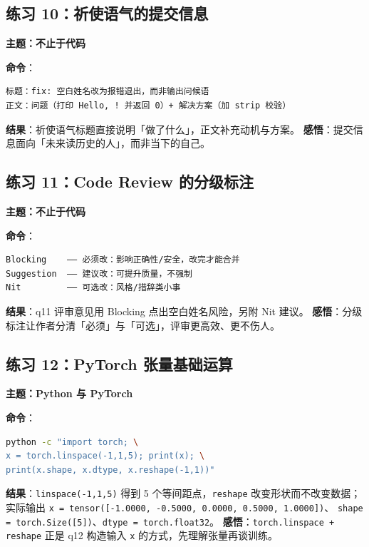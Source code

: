 \documentclass{hamesome-report}
\begin{document}
\subsection{练习 10：祈使语气的提交信息}
\textbf{主题：不止于代码}\par
\textbf{命令}：
\begin{lstlisting}[language={}]
标题：fix: 空白姓名改为报错退出，而非输出问候语
正文：问题（打印 Hello, ! 并返回 0）+ 解决方案（加 strip 校验）
\end{lstlisting}
\textbf{结果}：祈使语气标题直接说明「做了什么」，正文补充动机与方案。
\textbf{感悟}：提交信息面向「未来读历史的人」，而非当下的自己。

\subsection{练习 11：Code Review 的分级标注}
\textbf{主题：不止于代码}\par
\textbf{命令}：
\begin{lstlisting}[language={}]
Blocking    —— 必须改：影响正确性/安全，改完才能合并
Suggestion  —— 建议改：可提升质量，不强制
Nit         —— 可选改：风格/措辞类小事
\end{lstlisting}
\textbf{结果}：q11 评审意见用 Blocking 点出空白姓名风险，另附 Nit 建议。
\textbf{感悟}：分级标注让作者分清「必须」与「可选」，评审更高效、更不伤人。

\subsection{练习 12：PyTorch 张量基础运算}
\textbf{主题：Python 与 PyTorch}\par
\textbf{命令}：
\begin{lstlisting}[language=bash]
python -c "import torch; \
x = torch.linspace(-1,1,5); print(x); \
print(x.shape, x.dtype, x.reshape(-1,1))"
\end{lstlisting}
\textbf{结果}：\texttt{linspace(-1,1,5)} 得到 5 个等间距点，\texttt{reshape}
改变形状而不改变数据；实际输出
\texttt{x = tensor([-1.0000, -0.5000, 0.0000, 0.5000, 1.0000])}、
\texttt{shape = torch.Size([5])}、\texttt{dtype = torch.float32}。
\textbf{感悟}：\texttt{torch.linspace + reshape} 正是 q12 构造输入
\texttt{x} 的方式，先理解张量再谈训练。

\end{document}
